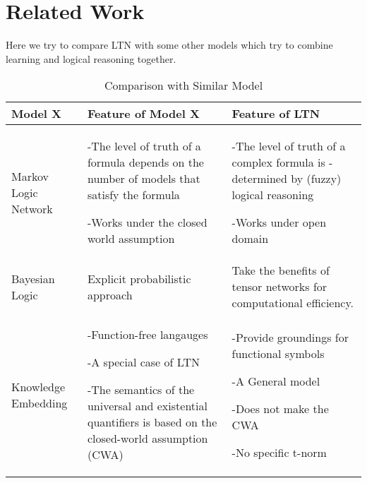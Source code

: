 
\section{Related Work}
Here we try to compare LTN with some other models which try to combine learning and logical reasoning together.

\begin{table*}[]
    \centering
    \begin{tabularx}{\textwidth}{L{0.2\textwidth}|L{0.35\textwidth}|L{0.35\textwidth}}
        \toprule
        Model X & Feature of Model X  & Feature of LTN \\
        \midrule
        Markov Logic \newline Network
        &
        -The level of truth of a formula depends on the number of models that satisfy the formula

        -Works under the closed world assumption
        &
        -The level of truth of a complex formula is -determined by (fuzzy) logical reasoning

        -Works under open domain
        \\
        \midrule
        Bayesian Logic
        &
        Explicit probabilistic approach
        &
        Take the benefits of tensor networks for computational efficiency.
        \\
        \midrule
        Knowledge \newline Embedding
        &
        -Function-free langauges

        -A special case of LTN

        -The semantics of the universal and existential quantifiers is based on the closed-world assumption (CWA)

        &
        -Provide groundings for functional symbols

        -A General model

        -Does not make the CWA

        -No specific t-norm
        \\
        \bottomrule
    \end{tabularx}
    \caption{Comparison with Similar Model}
    \label{tab:my_label}
\end{table*}
